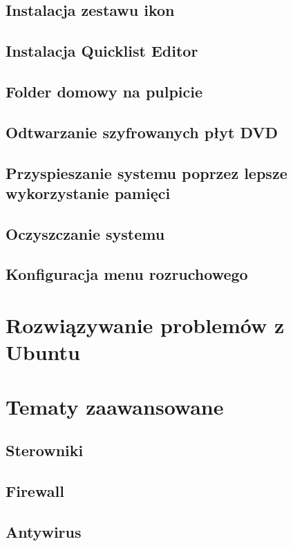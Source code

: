 \documentclass[a4paper,11pt,oneside]{mwart}
\begin{document}
		\subsection{Instalacja zestawu ikon}
			
		\subsection{Instalacja Quicklist Editor}
			
		\subsection{Folder domowy na pulpicie}
			
		\subsection{Odtwarzanie szyfrowanych płyt DVD}
			
		\subsection{Przyspieszanie systemu poprzez lepsze wykorzystanie pamięci}
			
		\subsection{Oczyszczanie systemu}
			
		\subsection{Konfiguracja menu rozruchowego}
			
	\section{Rozwiązywanie problemów z Ubuntu}
			\label{rozwiązywanie problemów}
	\section{Tematy zaawansowane}
		\subsection{Sterowniki}
			
		\subsection{Firewall}
			
		\subsection{Antywirus}
			
\end{document}
